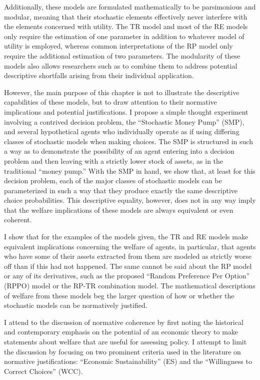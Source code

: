 \documentclass[../main.tex]{subfiles}
\begin{document}
Additionally, these models are formulated mathematically to be parsimonious and modular, meaning that their stochastic elements effectively never interfere with the elements concerned with utility.
The TR model and most of the RE models only require the estimation of one parameter in addition to whatever model of utility is employed, whereas common interpretations of the RP model only require the additional estimation of two parameters.
The modularity of these models also allows researchers such as \textcite{Loomes2002} to combine them to address potential descriptive shortfalls arising from their individual application.

However, the main purpose of this chapter is not to illustrate the descriptive capabilities of these models, but to draw attention to their normative implications and potential justifications.
I propose a simple thought experiment involving a contrived decision problem, the \enquote{Stochastic Money Pump} (SMP), and several hypothetical agents who individually operate as if using differing classes of stochastic models when making choices.
The SMP is structured in such a way as to demonstrate the possibility of an agent entering into a decision problem and then leaving with a strictly lower stock of assets, as in the traditional \enquote{money pump.}
With the SMP in hand, we show that, at least for this decision problem, each of the major classes of stochastic models can be parameterized in such a way that they produce exactly the same descriptive choice probabilities.
This descriptive equality, however, does not in any way imply that the welfare implications of these models are always equivalent or even coherent.

I show that for the examples of the models given, the TR and RE models make equivalent implications concerning the welfare of agents, in particular, that agents who have some of their assets extracted from them are modeled as strictly worse off than if this had not happened.
The same cannot be said about the RP model or any of its derivatives, such as the proposed \enquote{Random Preference Per Option} (RPPO) model or the RP-TR combination model.
The mathematical descriptions of welfare from these models beg the larger question of how or whether the stochastic models can be normatively justified.

I attend to the discussion of normative coherence by first noting the historical and contemporary emphasis on the potential of an economic theory to make statements about welfare that are useful for assessing policy.
I attempt to limit the discussion by focusing on two prominent criteria used in the literature on normative justifications: \enquote{Economic Sustainability} (ES) and the \enquote{Willingness to Correct Choices} (WCC).
\end{document}
